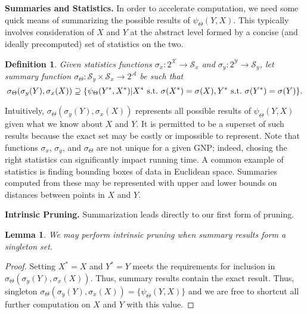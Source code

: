\documentclass{article}
\newtheorem{lemma}{Lemma}
\newtheorem{definition} {Definition}
\newcommand{\GNP}[1][\psi]{{#1}_{\Theta}}
\newcommand{\st}{{\rm~s.t.~}}
\begin{document}

{\bf Summaries and Statistics.}  In order to accelerate computation,
we need some quick means of summarizing the possible results of
$\GNP(Y,X)$.  This typically involves consideration of $X$ and $Y$ at
the abstract level formed by a concise (and ideally precomputed) set
of statistics on the two.
\begin{definition}
  Given statistics functions $\sigma_x \colon 2^{\mathcal{X}} \to
  \mathcal{S}_x$ and $\sigma_y \colon 2^{\mathcal{Y}} \to
  \mathcal{S}_y$, let summary function $\GNP[\sigma] \colon
  \mathcal{S}_y \times \mathcal{S}_x \to 2^\mathcal{A}$ be such that
  \[
  \GNP[\sigma](\sigma_y(Y),\sigma_x(X)) \supseteq \{\GNP(Y^*,X^*) | X^* \st \sigma(X^*) = \sigma(X), Y^* \st \sigma(Y^*) = \sigma(Y)\}.
  \]
\end{definition}
\noindent Intuitively, $\GNP[\sigma](\sigma_y(Y),\sigma_x(X))$
represents all possible results of $\GNP(Y,X)$ given what we know
about $X$ and $Y$.  It is permitted to be a superset of such results
because the exact set may be costly or impossible to represent.  Note
that functions $\sigma_x$, $\sigma_y$, and $\GNP[\sigma]$ are not
unique for a given GNP; indeed, chosing the right statistics can
significantly impact running time.  A common example of statistics is
finding bounding boxes of data in Euclidean space.  Summaries computed
from these may be represented with upper and lower bounds on distances
between points in $X$ and $Y$.


{\bf Intrinsic Pruning.}  Summarization leads directly to our first
form of pruning.
\begin{lemma}
  We may perform {\em intrinsic pruning} when summary results form a
  singleton set.
\end{lemma}
\begin{proof}
  Setting $X^* = X$ and $Y^* = Y$ meets the requirements for inclusion
  in $\GNP[\sigma](\sigma_y(Y),\sigma_x(X))$.  Thus, summary results
  contain the exact result.  Thus, singleton
  $\GNP[\sigma](\sigma_y(Y),\sigma_x(X)) = \{\GNP(Y,X)\}$ and we are
  free to shortcut all further computation on $X$ and $Y$ with this
  value.
\end{proof}
\end{document}
